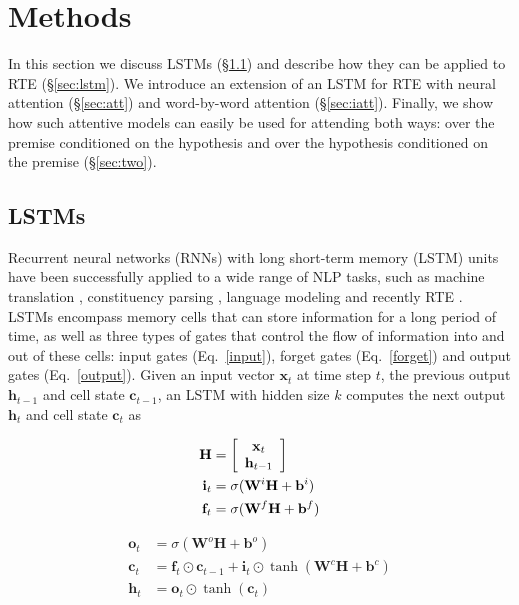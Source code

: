 \documentclass{article}
\begin{document}
\section{Methods}
In this section we discuss LSTMs (\S\ref{sec:background}) and describe how they can be applied to RTE (\S\ref{sec:lstm}).
We introduce an extension of an LSTM for RTE with neural attention (\S\ref{sec:att}) and word-by-word attention (\S\ref{sec:iatt}).
Finally, we show how such attentive models can easily be used for attending both ways: over the premise conditioned on the hypothesis and over the hypothesis conditioned on the premise (\S\ref{sec:two}).

\subsection{LSTMs}
\label{sec:background}
Recurrent neural networks (RNNs) with long short-term memory (LSTM) units~\citep{hochreiter1997long} have been successfully applied to a wide range of NLP tasks, such as machine translation \citep{sutskever2014sequence}, constituency parsing \citep{vinyals2014grammar}, language modeling \citep{zaremba2014recurrent} and recently RTE \citep{bowman2015large}.
LSTMs encompass memory cells that can store information for a long period of time, as well as three types of gates that control the flow of information into and out of these cells: input gates (Eq.~\ref{input}), forget gates (Eq.~\ref{forget}) and output gates (Eq.~\ref{output}). Given an input vector $\mathbf{x}_t$ at time step $t$, the previous output $\mathbf{h}_{t-1}$ and cell state $\mathbf{c}_{t-1}$, an LSTM with hidden size $k$ computes the next output $\mathbf{h}_t$ and cell state $\mathbf{c}_t$ as

\begin{minipage}{0.35\linewidth}
  \noindent
  \begin{align}
    \mathbf{H} &= \left[{
      \begin{array}{*{20}c}
        \mathbf{x}_t \\
        \mathbf{h}_{t-1}
      \end{array} }
    \right]\\
    \mathbf{i}_t &= \sigma(\mathbf{W}^i\mathbf{H}+\mathbf{b}^i) \label{input}\\
    \mathbf{f}_t &= \sigma(\mathbf{W}^f\mathbf{H}+\mathbf{b}^f) \label{forget}
  \end{align}
\end{minipage}
\hspace{2em}
\begin{minipage}{0.53\linewidth}
  \begin{align}
    \mathbf{o}_t &= \sigma(\mathbf{W}^o\mathbf{H}+\mathbf{b}^o) \label{output}\\[.3em]
    \mathbf{c}_t &= \mathbf{f}_t \odot \mathbf{c}_{t-1} + \mathbf{i}_t \odot
    \tanh(\mathbf{W}^c\mathbf{H}+\mathbf{b}^c)\\[.3em]
    \mathbf{h}_t &= \mathbf{o}_t \odot \tanh(\mathbf{c}_t)
  \end{align}
\end{minipage}
\end{document}
